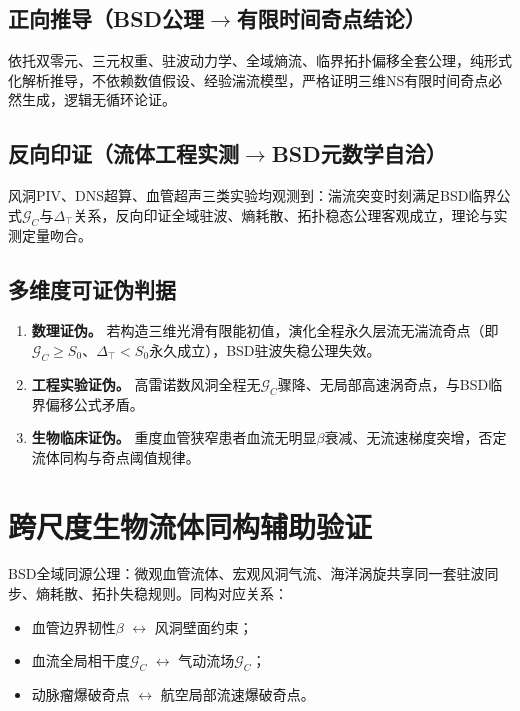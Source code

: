 \documentclass[11pt,a4paper]{ctexart}
\theoremstyle{remark}
\newcommand{\Szero}{S_{0}}
\newcommand{\GC}{\mathcal{G}_{\!C}}
\newcommand{\Dtop}{\Delta_{\!\top}}
\begin{document}
\subsection{正向推导（BSD公理$\to$有限时间奇点结论）}

依托双零元、三元权重、驻波动力学、全域熵流、临界拓扑偏移全套公理，纯形式化解析推导，不依赖数值假设、经验湍流模型，严格证明三维NS有限时间奇点必然生成，逻辑无循环论证。

\subsection{反向印证（流体工程实测$\to$BSD元数学自洽）}

风洞PIV、DNS超算、血管超声三类实验均观测到：湍流突变时刻满足BSD临界公式$\GC$与$\Dtop$关系，反向印证全域驻波、熵耗散、拓扑稳态公理客观成立，理论与实测定量吻合。

\subsection{多维度可证伪判据}

\begin{enumerate}
    \item \textbf{数理证伪。} 若构造三维光滑有限能初值，演化全程永久层流无湍流奇点（即$\GC\ge\Szero$、$\Dtop<\Szero$永久成立），BSD驻波失稳公理失效。
    \item \textbf{工程实验证伪。} 高雷诺数风洞全程无$\GC$骤降、无局部高速涡奇点，与BSD临界偏移公式矛盾。
    \item \textbf{生物临床证伪。} 重度血管狭窄患者血流无明显$\beta$衰减、无流速梯度突增，否定流体同构与奇点阈值规律。
\end{enumerate}

\section{跨尺度生物流体同构辅助验证}\label{sec:bio}

BSD全域同源公理：微观血管流体、宏观风洞气流、海洋涡旋共享同一套驻波同步、熵耗散、拓扑失稳规则。同构对应关系：
\begin{itemize}
    \item 血管边界韧性$\beta$ $\leftrightarrow$ 风洞壁面约束；
    \item 血流全局相干度$\GC$ $\leftrightarrow$ 气动流场$\GC$；
    \item 动脉瘤爆破奇点 $\leftrightarrow$ 航空局部流速爆破奇点。
\end{itemize}
\end{document}
